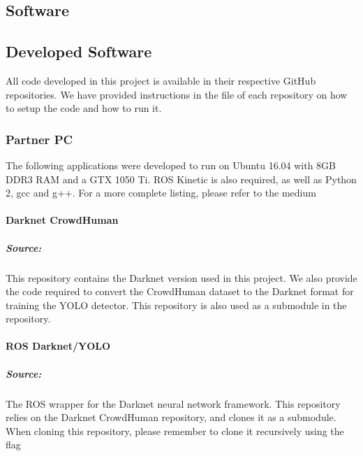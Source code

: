 \begin{appendices}
\chapter{Software}
\section{Developed Software}
All code developed in this project is available in their respective GitHub repositories. We have provided instructions in the  file of each repository on how to setup the code and how to run it.

\subsection{Partner PC}
The following applications were developed to run on Ubuntu 16.04 with 8GB DDR3 RAM and a GTX 1050 Ti. ROS Kinetic is also required, as well as Python 2, gcc and g++. For a more complete listing, please refer to the medium 

\subsubsection{Darknet CrowdHuman}
\paragraph{Source:} 

\paragraph{}This repository contains the Darknet version used in this project. We also provide the code required to convert the CrowdHuman dataset to the Darknet format for training the YOLO detector. This repository is also used as a submodule in the  repository.

\subsubsection{ROS Darknet/YOLO}
\paragraph{Source:} 

\paragraph{}The ROS wrapper for the Darknet neural network framework. This repository relies on the Darknet CrowdHuman repository, and clones it as a submodule. When cloning this repository, please remember to clone it recursively using the  flag


\end{appendices}
